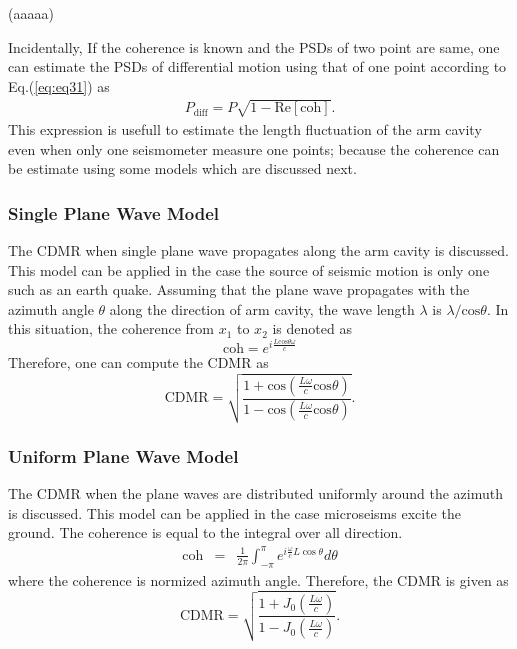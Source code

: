 \documentclass[a4paper,12pt]{book}
\begin{document}
(aaaaa)

Incidentally, If the coherence is known and the PSDs of two point are same, one can estimate the PSDs of differential motion using that of one point according to Eq.(\ref{eq:eq31}) as
\begin{eqnarray}
  P_\mathrm{diff} = P \sqrt{1 - \mathrm{Re[coh]}}. \label{eq:eq34}
\end{eqnarray}
This expression is usefull to estimate the length fluctuation of the arm cavity even when only one seismometer measure one points; because the coherence can be estimate using some models which are discussed next.

\subsubsection{Single Plane Wave Model}
The CDMR when single plane wave propagates along the arm cavity is discussed. This model can be applied in the case the source of seismic motion is only one such as an earth quake. Assuming that the plane wave propagates with the azimuth angle $\theta$ along the direction of arm cavity, the wave length $\lambda$ is $\lambda/\mathrm{cos}\theta$. In this situation, the coherence from $x_1$ to $x_2$ is denoted as
\begin{equation}
  \mathrm{coh}=e^{i\frac{L\mathrm{cos}\theta\omega}{c}}
\end{equation}
Therefore, one can compute the CDMR as
\begin{equation}  \label{eq:eq18}
  \mathrm{CDMR} = \sqrt{\frac{1+\mathrm{cos}(\frac{L\omega}{c}\mathrm{cos}\theta)}{1-\mathrm{cos}(\frac{L\omega}{c}\mathrm{cos}\theta)}}.
\end{equation}


\subsubsection{Uniform Plane Wave Model}
The CDMR when the plane waves are distributed uniformly around the azimuth is discussed. This model can be applied in the case microseisms excite the ground. The coherence is equal to the integral over all direction.
\begin{eqnarray} \label{eq:eq19}
  \mathrm{coh} &=& \frac{1}{2\pi} \int_{-\pi}^{\pi} e^{i\frac{\omega}{c} L\cos \theta} d \theta
\end{eqnarray}
where the coherence is normized azimuth angle. Therefore, the CDMR is given as
\begin{equation}  \label{eq:eq20}
  \mathrm{CDMR} = \sqrt{\frac{1+J_0(\frac{L\omega}{c})}{1-J_0(\frac{L\omega}{c})}} .
\end{equation}
\end{document}
